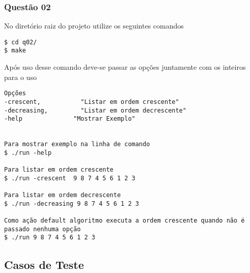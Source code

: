 \documentclass[11pt,a4paper]{article}
\begin{document}
\subsubsection{Questão 02}
No diretório raiz do projeto utilize os seguintes comandos
\begin{verbatim}
$ cd q02/
$ make
\end{verbatim}

Após uso desse comando deve-se passar as opções juntamente com os inteiros
para o uso

\begin{verbatim}
Opções
-crescent, 			 "Listar em ordem crescente"
-decreasing, 		 "Listar em ordem decrescente"
-help 		       "Mostrar Exemplo"


Para mostrar exemplo na linha de comando
$ ./run -help

Para listar em ordem crescente
$ ./run -crescent  9 8 7 4 5 6 1 2 3

Para listar em ordem decrescente
$ ./run -decreasing 9 8 7 4 5 6 1 2 3

Como ação default algoritmo executa a ordem crescente quando não é passado nenhuma opção
$ ./run 9 8 7 4 5 6 1 2 3

\end{verbatim}

\subsection{Casos de Teste}
\end{document}
